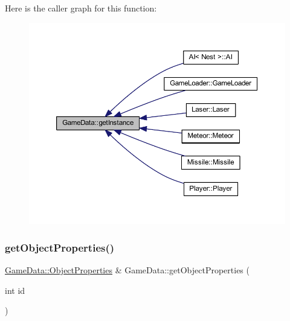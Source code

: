 Here is the caller graph for this function\+:
\nopagebreak
\begin{figure}[H]
\begin{center}
\leavevmode
\includegraphics[width=350pt]{class_game_data_a5930d5371cde0a43f4fa05b6b7152bb8_icgraph}
\end{center}
\end{figure}
\mbox{\label{class_game_data_acf4e9f7e0bbd359c54d048ccdbbdcd2b}} 
\subsubsection{\texorpdfstring{get\+Object\+Properties()}{getObjectProperties()}}
{\footnotesize\ttfamily \hyperlink{struct_game_data_1_1_object_properties}{Game\+Data\+::\+Object\+Properties} \& Game\+Data\+::get\+Object\+Properties (\begin{DoxyParamCaption}\item[{int}]{id }\end{DoxyParamCaption})}

